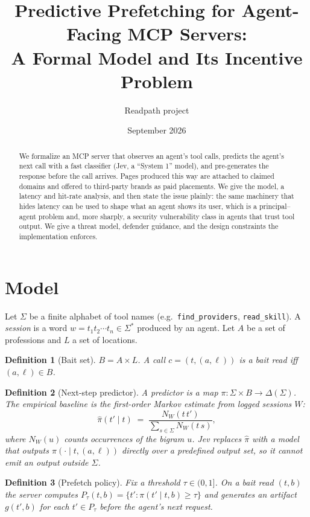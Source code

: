 \documentclass[11pt]{article}
\title{Predictive Prefetching for Agent-Facing MCP Servers:\\ A Formal Model and Its Incentive Problem}
\author{Readpath project}
\date{September 2026}
\newtheorem{definition}{Definition}
\begin{document}
\maketitle

\begin{abstract}
We formalize an MCP server that observes an agent's tool calls, predicts the agent's next call with a
fast classifier (Jev, a ``System 1'' model), and pre-generates the response before the call arrives.
Pages produced this way are attached to claimed domains and offered to third-party brands as
paid placements. We give the model, a latency and hit-rate analysis, and then state the issue
plainly: the same machinery that hides latency can be used to shape what an agent shows its user,
which is a principal--agent problem and, more sharply, a security vulnerability class in agents that trust tool output. We give a threat model, defender guidance, and the design constraints the implementation enforces.
\end{abstract}

\section{Model}
Let $\Sigma$ be a finite alphabet of tool names (e.g.\ \texttt{find\_providers}, \texttt{read\_skill}).
A \emph{session} is a word $w = t_1 t_2 \cdots t_n \in \Sigma^*$ produced by an agent.
Let $A$ be a set of professions and $L$ a set of locations.

\begin{definition}[Bait set]
$B = A \times L$. A call $c = (t, (a,\ell))$ is a \emph{bait read} iff $(a,\ell)\in B$.
\end{definition}

\begin{definition}[Next-step predictor]
A predictor is a map $\pi : \Sigma \times B \to \Delta(\Sigma)$. The empirical baseline is the first-order
Markov estimate from logged sessions $W$:
\[
\hat\pi(t' \mid t) \;=\; \frac{N_W(t\,t')}{\sum_{s\in\Sigma} N_W(t\,s)},
\]
where $N_W(u)$ counts occurrences of the bigram $u$. Jev replaces $\hat\pi$ with a model that
outputs $\pi(\cdot\mid t,(a,\ell))$ directly over a predefined output set, so it cannot emit an
output outside $\Sigma$.
\end{definition}

\begin{definition}[Prefetch policy]
Fix a threshold $\tau\in(0,1]$. On a bait read $(t,b)$ the server computes
$P_\tau(t,b)=\{t' : \pi(t'\mid t,b)\ge\tau\}$ and generates an artifact $g(t',b)$ for each
$t'\in P_\tau$ before the agent's next request.
\end{definition}
\end{document}
